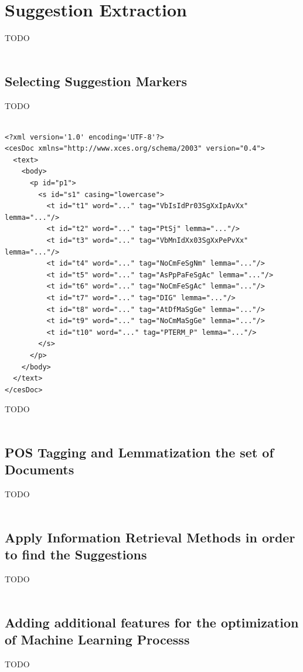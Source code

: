 \section{Suggestion Extraction}\label{33_ref}
TODO\\
\\
\subsection{Selecting Suggestion Markers}\label{331_ref}
TODO\\
\\

\begin{lstlisting}[frame=single, basicstyle=\small]
<?xml version='1.0' encoding='UTF-8'?>
<cesDoc xmlns="http://www.xces.org/schema/2003" version="0.4">
  <text>
    <body>
      <p id="p1">
        <s id="s1" casing="lowercase">
          <t id="t1" word="..." tag="VbIsIdPr03SgXxIpAvXx" lemma="..."/>
          <t id="t2" word="..." tag="PtSj" lemma="..."/>
          <t id="t3" word="..." tag="VbMnIdXx03SgXxPePvXx" lemma="..."/>
          <t id="t4" word="..." tag="NoCmFeSgNm" lemma="..."/>
          <t id="t5" word="..." tag="AsPpPaFeSgAc" lemma="..."/>
          <t id="t6" word="..." tag="NoCmFeSgAc" lemma="..."/>
          <t id="t7" word="..." tag="DIG" lemma="..."/>
          <t id="t8" word="..." tag="AtDfMaSgGe" lemma="..."/>
          <t id="t9" word="..." tag="NoCmMaSgGe" lemma="..."/>
          <t id="t10" word="..." tag="PTERM_P" lemma="..."/>
        </s>
      </p>
    </body>
  </text>
</cesDoc>
\end{lstlisting}

TODO\\
\\

\subsection{POS Tagging and Lemmatization the set of Documents}\label{332_ref}
TODO\\
\\
\subsection{Apply Information Retrieval Methods in order to find the Suggestions}\label{333_ref}
TODO\\
\\
\subsection{Adding additional features for the optimization of Machine Learning Processs}\label{334_ref}
TODO\\
\\
